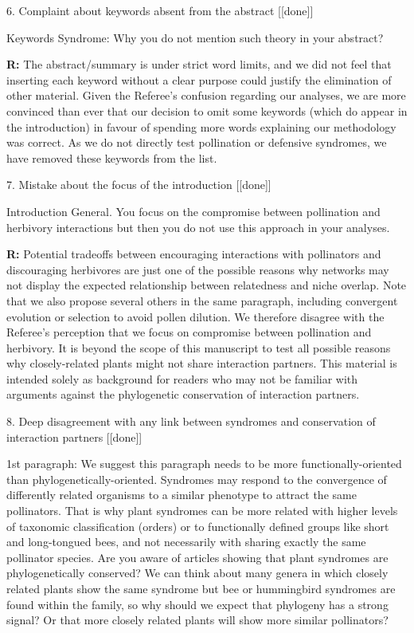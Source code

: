 \documentclass[12pt]{letter}
\newenvironment{refquote}{\bigskip \begin{it}}{\end{it}\smallskip}
\begin{document}
	6. Complaint about keywords absent from the abstract [[done]]

		\begin{refquote}
		Keywords
		Syndrome:  Why you do not mention such theory in your abstract?
		\end{refquote}


		\textbf{R:} The abstract/summary is under strict word limits, and we did not feel that inserting each keyword without a clear purpose could justify the elimination of other material. Given the Referee's confusion regarding our analyses, we are more convinced than ever that our decision to omit some keywords (which do appear in the introduction) in favour of spending more words explaining our methodology was correct. As we do not directly test pollination or defensive syndromes, we have removed these keywords from the list.


	7. Mistake about the focus of the introduction [[done]]

		\begin{refquote}
		Introduction
		General. You focus on the compromise between pollination and herbivory interactions but then you do not use this approach in your analyses.
		\end{refquote}


		\textbf{R:} Potential tradeoffs between encouraging interactions with pollinators and discouraging herbivores are just one of the possible reasons why networks may not display the expected relationship between relatedness and niche overlap. Note that we also propose several others in the same paragraph, including convergent evolution or selection to avoid pollen dilution. We therefore disagree with the Referee's perception that we focus on compromise between pollination and herbivory. It is beyond the scope of this manuscript to test all possible reasons why closely-related plants might not share interaction partners. This material is intended solely as background for readers who may not be familiar with arguments against the phylogenetic conservation of interaction partners.


	8. Deep disagreement with any link between syndromes and conservation of interaction partners [[done]]

		\begin{refquote}
		1st paragraph: We suggest this paragraph needs to be more functionally-oriented than phylogenetically-oriented. Syndromes may respond to the convergence of differently related organisms to a similar phenotype to attract the same pollinators. That is why plant syndromes can be more related with higher levels of taxonomic classification (orders) or to functionally defined groups like short and long-tongued bees, and not necessarily with sharing exactly the same pollinator species. Are you aware of articles showing that plant syndromes are phylogenetically conserved? We can think about many genera in which closely related plants show the same syndrome but bee or hummingbird syndromes are found within the family, so why should we expect that phylogeny has a strong signal? Or that more closely related plants will show more similar pollinators?
		\end{refquote}
\end{document}
